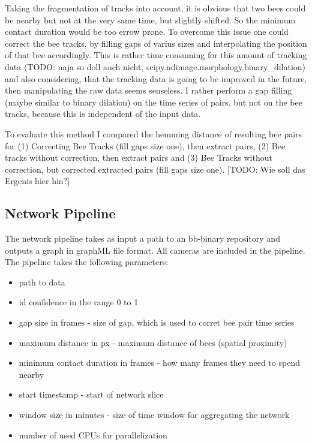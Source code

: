 Taking the fragmentation of tracks into account, it is obvious that two bees could be nearby but not at the very same time, but slightly shifted. So the minimum contact duration would be too errow prone. To overcome this issue one could correct the bee tracks, by filling gaps of varius sizes and interpolating the position of that bee accordingly. This is rather time consuming for this amount of tracking data (TODO: naja so doll auch nicht, scipy.ndimage.morphology.binary\_dilation) and also considering, that the tracking data is going to be improved in the future, then manipulating the raw data seems senseless. I rather perform a gap filling (maybe similar to binary dilation) on the time series of pairs, but not on the bee tracks, because this is independent of the input data.

To evaluate this method I compared the hemming distance of resulting bee pairs for (1) Correcting Bee Tracks (fill gaps size one), then extract pairs, (2) Bee tracks without correction, then extract pairs and (3) Bee Tracks without correction, but corrected extracted pairs (fill gaps size one). [TODO: Wie soll das Ergenis hier hin?]

\subsection{Network Pipeline}

The network pipeline takes as input a path to an bb-binary repository and outputs a graph in graphML file format. All cameras are included in the pipeline. The pipeline takes the following parameters:

\begin{itemize}
\item path to data
\item id confidence in the range 0 to 1
\item gap size in frames - size of gap, which is used to corret bee pair time series
\item maximum distance in px - maximum distance of bees (spatial proximity)
\item minimum contact duration in frames - how many frames they need to spend nearby
\item start timestamp - start of network slice
\item window size in minutes - size of time window for aggregating the network
\item number of used CPUs for parallelization
\end{itemize}

